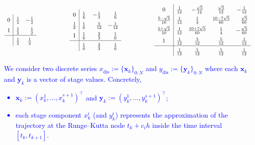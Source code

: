 \documentclass[a4paper,10pt,reqno]{amsart}
\theoremstyle{definition}
\newcommand{\dis}{\text{dis}}
\begin{document}
\begin{table}[H]
\centering
$\setlength{\tabcolsep}{20pt}
\renewcommand{\arraystretch}{1.5}\begin{array}{c|cc}
0  &  \frac{1}{2} & - \frac{1}{2} \\
   1  & \frac{1}{2} &\phantom{-}\frac{1}{2} \\ \hline 
   & \frac{1}{2}& \frac{1}{2}
\end{array}\hspace{2cm}\begin{array}{c|ccc}
0  &  \frac{1}{6} & - \frac{1}{3} & \phantom{-}\frac{1}{6} \\
   \frac{1}{2}  &\frac{1}{6} &  \phantom{-}\frac{5}{12} & -\frac{1}{12} \\
 1   &\frac{1}{6} & \phantom{-} \frac{2}{3} & \phantom{-}\frac{1}{6}  \\ \hline 
 &\frac{1}{6} &  \phantom{-}\frac{2}{3} & \phantom{-}\frac{1}{6} 
\end{array}\hspace{2cm}\begin{array}{c|cccc}
0  &  \frac{1}{12} & - \frac{\sqrt{5}}{12} & \frac{\sqrt{5}}{12}&-\frac{1}{12} \\
\frac{5-\sqrt{5}}{10} &  \frac{1}{12} &  \frac{1}{4} & \frac{10-7\sqrt{5}}{60}&\phantom{-}\frac{\sqrt{5}}{60} \\
\frac{5+\sqrt{5}}{10}  &  \frac{1}{12} & \frac{10+7\sqrt{5}}{60} & \frac{1}{4}&-\frac{\sqrt{5}}{60} \\
1  &  \frac{1}{12} &  \frac{5}{12} & \frac{5}{12}&\phantom{-}\frac{1}{12} \\ \hline
 &\frac{1}{12} &  \frac{5}{12} & \frac{5}{12} & \phantom{-}\frac{1}{12}
\end{array}$
\caption{Lobatto~IIIC methods with $r = 2$, $r = 3$  and $r = 4.$}
\label{tab:Lobatto}
\end{table}
\textcolor{blue}{
We consider two discrete series $x_\dis^{}:=\{\mathbf{x}_k\}_{0:N}$ and  $y_\dis^{}:=\{\mathbf{y}_k\}_{0:N}$
where each $\mathbf{x}_k$ and $\mathbf{y}_k$ is a vector of stage values. Concretely,
\begin{itemize}
    \item $\mathbf{x}_k:=(x_k^1,\ldots,x_k^{s+1})^\top$ and $\mathbf{y}_k:=(y_k^1,\ldots,y_k^{s+1})^\top$;
    \item each stage component $x_k^i$ (and $y_k^i$) represents the approximation of the trajectory at the Runge–Kutta node $t_k+c_ih$ inside the time interval 
$[t_k,t_{k+1}]$.
\end{itemize}}
\end{document}
